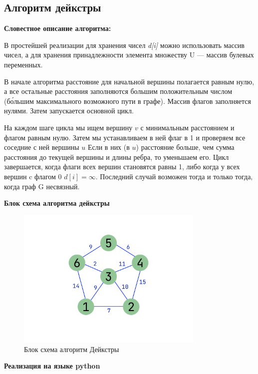 \subsection{Алгоритм дейкстры}

\textbf{Словестное описание алгоритма: }

В простейшей реализации для хранения чисел \textit{d[i]} можно использовать массив чисел, а для хранения принадлежности элемента множеству U — массив булевых переменных.

В начале алгоритма расстояние для начальной вершины полагается равным нулю, а все остальные расстояния заполняются большим положительным числом (бо́льшим максимального возможного пути в графе). Массив флагов заполняется нулями. Затем запускается основной цикл.

На каждом шаге цикла мы ищем вершину $v$ с минимальным расстоянием и флагом равным нулю. Затем мы устанавливаем в ней флаг в 1 и проверяем все соседние с ней вершины $u$ Если в них (в $u$) расстояние больше, чем сумма расстояния до текущей вершины и длины ребра, то уменьшаем его. Цикл завершается, когда флаги всех вершин становятся равны 1, либо когда у всех вершин c флагом 0 $d[i]=\infty$. Последний случай возможен тогда и только тогда, когда граф G несвязный. 

\textbf{Блок схема алгоритма дейкстры}


\begin{figure}[H]
    \centering
    \includegraphics[width=0.8\textwidth]{./flowcharts/graph.png}
    \caption{Блок схема алгоритм Дейкстры}
\end{figure}


\textbf{Реализация на языке python}






